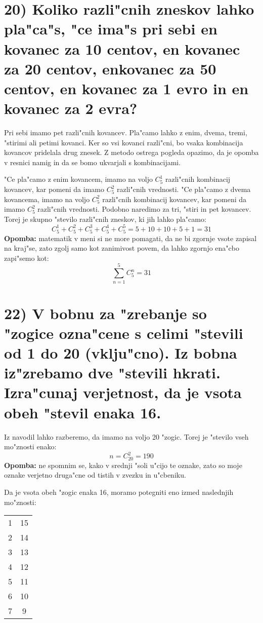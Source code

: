 \documentclass[a4paper, 12pt]{article}
\begin{document}
\section{20) Koliko razli"cnih zneskov lahko pla"ca"s, "ce ima"s pri sebi en kovanec za 10 centov, en kovanec za 20 centov, enkovanec za 50 centov, en kovanec  za 1 evro in en kovanec za 2 evra?}
Pri sebi imamo pet razli"cnih kovancev. Pla"camo lahko z enim, dvema, tremi, "stirimi ali petimi kovanci. Ker so vsi kovanci razli"cni, bo vsaka kombinacija kovancov pridelala drug znesek. Z metodo ostrega pogleda opazimo, da je opomba v resnici namig in da se bomo ukvarjali s kombinacijami.

"Ce pla"camo z enim kovancem, imamo na voljo $C_5^1$ razli"cnih kombinacij kovancev, kar pomeni da imamo $C_5^2$ razli"cnih vrednosti. "Ce pla"camo z dvema kovancema, imamo na voljo $C_5^2$ razli"cnih kombinacij kovancev, kar pomeni da imamo $C_5^2$ razli"cnih vrednosti. Podobno naredimo za tri, "stiri in pet kovancev. Torej je skupno "stevilo razli"cnih zneskov, ki jih lahko pla"camo:
\begin{equation*}
C_5^1 + C_5^2 + C_5^3 + C_5^4 + C_5^5 = 5 + 10 + 10 + 5 + 1 = 31
\end{equation*}
\textbf{Opomba:} matematik v meni si ne more pomagati, da ne bi zgornje vsote zapisal na kraj"se, zato zgolj samo kot zanimivost povem, da lahko zgornjo ena"cbo zapi"semo kot:
\begin{equation*}
\sum_{n=1}^{5} C_5^n = 31
\end{equation*}

\section{22) V bobnu za "zrebanje so "zogice ozna"cene s celimi "stevili od 1 do 20 (vklju"cno). Iz bobna iz"zrebamo dve "stevili hkrati. Izra"cunaj verjetnost, da je vsota obeh "stevil enaka 16.}
Iz navodil lahko razberemo, da imamo na voljo 20 "zogic. Torej je "stevilo vseh mo"znosti enako:
\begin{equation*}
n = C_{20}^2 = 190
\end{equation*}
\textbf{Opomba:} ne spomnim se, kako v srednji "soli u"cijo te oznake, zato so moje oznake verjetno druga"cne od tistih v zvezku in u"cbeniku.

Da je vsota obeh "zogic enaka 16, moramo potegniti eno izmed naslednjih mo"znosti:
\begin{table}[!htbp]
	\centering
	\begin{tabular}{c|c}
		1 & 15 \\
		2 & 14 \\
		3 & 13 \\
		4 & 12 \\
		5 & 11 \\
		6 & 10 \\
		7 & 9
	\end{tabular}
\end{table}
\end{document}
